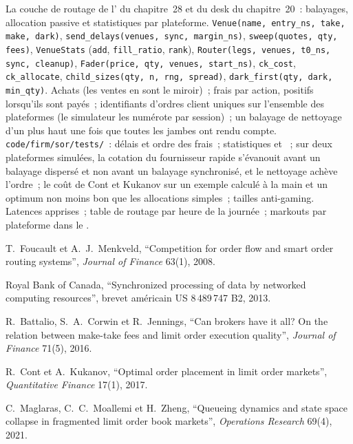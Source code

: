 \begin{build}
 La couche de routage de l' du chapitre~28 et du desk du chapitre~20~: balayages, allocation passive et statistiques par plateforme.
 \texttt{Venue(name, entry\_ns, take, make, dark)}, \texttt{send\_delays(venues, sync, margin\_ns)},
\texttt{sweep(quotes, qty, fees)}, \texttt{VenueStats} (\texttt{add}, \texttt{fill\_ratio}, \texttt{rank}), \texttt{Router(legs, venues, t0\_ns, sync, cleanup)},
\texttt{Fader(price, qty, venues, start\_ns)}, \texttt{ck\_cost}, \texttt{ck\_allocate}, \texttt{child\_sizes(qty, n, rng, spread)},
\texttt{dark\_first(qty, dark, min\_qty)}.
 Achats (les ventes en sont le miroir)~; frais par action, positifs lorsqu'ils sont payés~; identifiants d'ordres client uniques sur l'ensemble des plateformes (le simulateur les numérote
par session)~; un balayage de nettoyage d'un  plus haut une fois que toutes les jambes ont rendu compte.
 \texttt{code/firm/sor/tests/}~: délais et ordre des frais~; statistiques et ~; sur deux plateformes simulées, la cotation du fournisseur
rapide s'évanouit avant un balayage dispersé et non avant un balayage synchronisé, et le nettoyage achève l'ordre~; le coût de Cont et Kukanov sur un exemple calculé à la main
et un optimum non moins bon que les allocations simples~; tailles anti-gaming.
 Latences apprises~; table de routage par heure de la journée~; markouts par plateforme dans le .
\end{build}

\begin{omsources}
\item T.~Foucault et A.~J.~Menkveld, ``Competition for order flow and smart order routing systems'', \emph{Journal of Finance} 63(1), 2008.
\item Royal Bank of Canada, ``Synchronized processing of data by networked computing resources'', brevet américain US 8\,489\,747 B2, 2013.
\item R.~Battalio, S.~A.~Corwin et R.~Jennings, ``Can brokers have it all? On the relation between make-take fees and limit order execution
quality'', \emph{Journal of Finance} 71(5), 2016.
\item R.~Cont et A.~Kukanov, ``Optimal order placement in limit order markets'', \emph{Quantitative Finance} 17(1), 2017.
\item C.~Maglaras, C.~C.~Moallemi et H.~Zheng, ``Queueing dynamics and state space collapse in fragmented limit order book markets'',
\emph{Operations Research} 69(4), 2021.
\end{omsources}

